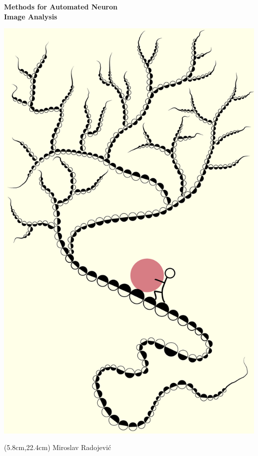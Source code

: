 %
%
\setlength{\parindent}{0pt}
\thispagestyle{empty}

\afterpage{\restorepagecolor} %

\vspace*{-2cm}
\begin{changemargin}{-0.5cm}{-0.5cm}

\begin{center}
	{\Huge\bf Methods for Automated Neuron \\[1ex] Image Analysis \\[2.2ex]}
\end{center}

\begin{center}
	\includegraphics[height=1.15\linewidth]{syziphus}
\end{center}

\begin{textblock*}{\textwidth}(5.8cm,22.4cm)
	{\Huge Miroslav Radojevi\'{c}}
\end{textblock*}

\end{changemargin}

